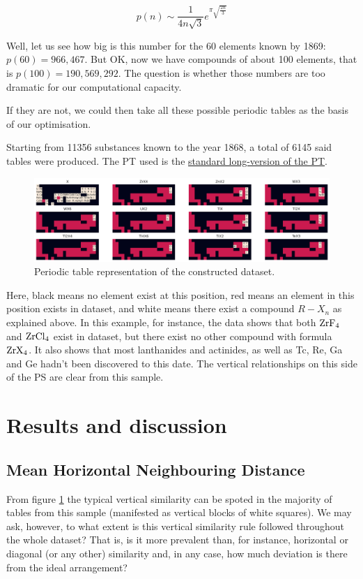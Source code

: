 \documentclass[]{article}
\begin{document}
{\[
p(n)\sim \frac{1}{4n\sqrt{3}}e^{\pi\sqrt{\frac{2n}{3}}}
\]

Well, let us see how big is this number for the 60 elements known by 1869:  $p(60)=966,467$.  But OK, now we have compounds of about 100 elements, that is $p(100)=190,569,292$.  The question is whether those numbers are too dramatic for our computational capacity.

If they are not, we could then take all these possible periodic tables as the basis of our optimisation.

}

Starting from 11356 substances known to the year 1868, a total of 6145 said tables were produced. The PT used is the \href{https://www.chemicool.com/longperiodictable.html}{standard long-version of the PT}.

\begin{figure}[h!]
  \centering
	\includegraphics[width=18.0cm]{tables.png}
	\caption{Periodic table representation of the constructed dataset.}
	\label{fig:fig1}
\end{figure}

Here, black means no element exist at this position, red means an element in this position exists in dataset, and white means there exist a compound $R-X_n$ as explained above. In this example, for instance, the data shows that both $\ce{ZrF4}$ and $\ce{ZrCl4}$ exist in dataset, but there exist no other compound with formula $\ce{ZrX4}$. It also shows that most lanthanides and actinides, as well as Tc, Re, Ga and Ge hadn't been discovered to this date. The vertical relationships on this side of the PS are clear from this sample.

\section{Results and discussion}

\subsection{Mean Horizontal Neighbouring Distance}
From figure \ref{fig:fig1} the typical vertical similarity can be spoted in the majority of tables from this sample (manifested as vertical blocks of white squares). We may ask, however, to what extent is this vertical similarity rule followed throughout the whole dataset? That is, is it more prevalent than, for instance, horizontal or diagonal (or any other) similarity and, in any case, how much deviation is there from the ideal arrangement?
\end{document}
